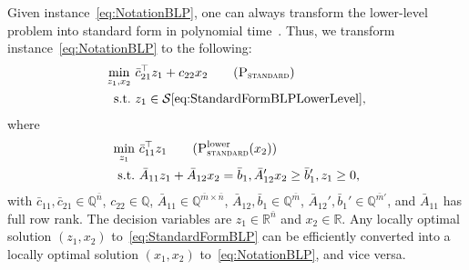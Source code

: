 \documentclass[runningheads,orivec]{llncs}
\newcommand{\MacroColor}[1]{#1}
\newcommand{\NVariables}{\MacroColor{n}}
\newcommand{\NConstraints}{\MacroColor{m}}
\newcommand{\OptSolSet}{\MacroColor{\mathcal{S}}}
\newcommand{\PartialOptValFunc}{\MacroColor{\psi}}
\begin{document}
\begin{appendix}


Given instance~\eqref{eq:NotationBLP}, one can always transform the lower-level problem into standard form in polynomial time~\cite{Schrijver1998}.
Thus, we transform instance~\eqref{eq:NotationBLP} to the following:
\begin{align}
\min_{z_1, x_2} \ &
\bar{c}_{2 1}^{\top} z_1 + c_{2 2} x_2
\tag{$\textsc{P}_{\textsc{standard}}$}
\label{eq:StandardFormBLP}
\\
\text{s.t.} \
&
z_1 \in 
\OptSolSet\eqref{eq:StandardFormBLPLowerLevel},
\notag
\end{align}
where
\begin{align}
\min_{z_1} \ & \bar{c}_{1 1}^{\top} z_1
\tag{$\textsc{P}_{\textsc{standard}}^{\text{lower}}(x_2)$}
\label{eq:StandardFormBLPLowerLevel}
\\
\text{s.t.} \
& 
\bar{A}_{1 1} z_1 + \bar{A}_{1 2} x_2 = \bar{b}_1, 
\bar{A}_{1 2}' x_2 \ge \bar{b}_1',
z_1 \ge 0,
\notag
\end{align}
with $\bar{c}_{1 1}, \bar{c}_{2 1} \in \mathbb{Q}^{\bar{\NVariables}}$, $c_{2 2} \in \mathbb{Q}$, $\bar{A}_{1 1} \in \mathbb{Q}^{\bar{\NConstraints} \times \bar{\NVariables}}$, $\bar{A}_{1 2}, \bar{b}_1 \in \mathbb{Q}^{\bar{\NConstraints}}$, $\bar{A}_{1 2}', \bar{b}_1' \in \mathbb{Q}^{\bar{\NConstraints}'}$, and $\bar{A}_{1 1}$ has full row rank.
The decision variables are $z_1 \in \mathbb{R}^{\bar{n}}$ and $x_2 \in \mathbb{R}$.
Any locally optimal solution $(z_1, x_2)$ to~\eqref{eq:StandardFormBLP} can be efficiently converted into a locally optimal solution $(x_1, x_2)$ to~\eqref{eq:NotationBLP}, and vice versa.


\end{appendix}
\end{document}
